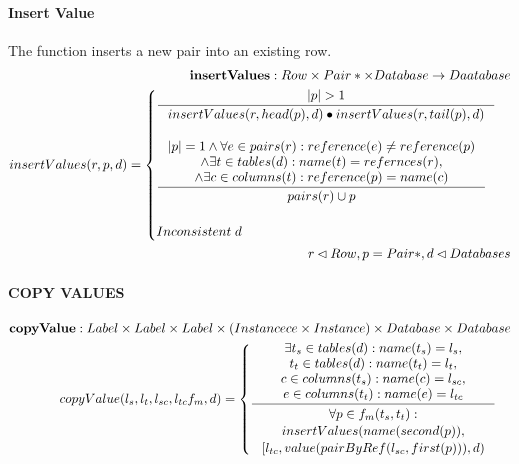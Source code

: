 \documentclass[11pt]{article}
\begin{document}
\paragraph{Insert Value} The function inserts a new pair into an existing row.
\begin{align*}
	\mathbf{insertValues} : Row \times Pair* \times Database \rightarrow Daatabase \\
	insertValues(r, p, d) = \begin{cases}
 		\inference{|p| > 1}{insertValues(r, head(p), d)\bullet insertValues(r, tail(p), d)}  \\ \\
 		\inference{|p| = 1 \wedge \forall e \in pairs(r) : reference(e) \neq reference(p) \\ \wedge \exists t \in tables(d) : name(t) = refernces(r), \\ \wedge \exists c \in columns(t) : reference(p) = name(c)}{pairs(r) \cup p} \\ \\
	 	 Inconsistent \; d
 		\end{cases} \\
r \lhd Row, p = Pair*,d \lhd Databases
\end{align*}
\paragraph{COPY VALUES}
\begin{align*}
	\mathbf{copyValue} : Label \times Label \times Label \times (Instancece \times Instance) \times Database \times Database \\
	copyValue(l_s, l_t, l_{sc}, l_{tc} f_m, d) = \begin{cases}
 		\inference{\exists t_s \in tables(d) : name(t_s) = l_s, \\ t_t \in tables(d) : name(t_t) = l_t, \\ c \in columns(t_s) : name(c) = l_{sc}, \\ e \in columns(t_t) : name(e) = l_{tc} }{\begin{gathered}
			\forall p \in f_m(t_s, t_t)  : \\ insertValues(name(second(p)), \\ [l_{tc},value(pairByRef(l_{sc}, first(p))),d)
		\end{gathered}}
 	\end{cases}
\end{align*}
\end{document}
